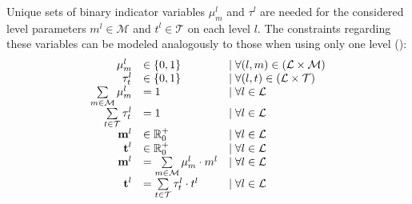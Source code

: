 \documentclass[a4paper,titlepage,onecolumn,oneside,12pt,nenglish,titlepage=firstiscover]{scrbook}
\theoremstyle{plain} %
\theoremstyle{definition} %
\theoremstyle{remark} %
\theoremstyle{plain}
\newcommand{\RR}{\mathbb{R}} %
\newcommand{\minimizerLength}{m}
\newcommand{\threshold}{t}
\newcommand{\level}{l}
\newcommand{\possibleMinimizerLengths}{\mathcal{M}}
\newcommand{\possibleThresholds}{\mathcal{T}}
\newcommand{\indicatorm}{\mu}
\newcommand{\indicatort}{\tau}
\newcommand{\varMinimizerLength}{\textbf{\minimizerLength}}
\newcommand{\varThreshold}{\textbf{\threshold}}
\begin{document}
Unique sets of binary indicator variables $\indicatorm^\level_\minimizerLength$ and $\indicatort^\level$ are needed for the considered level parameters $\minimizerLength^\level \in \possibleMinimizerLengths$ and $\threshold^\level \in \possibleThresholds$ on each level $\level$.
The constraints regarding these variables can be modeled analogously to those when using only one level ():
\[ \begin{array}{rll}
	\indicatorm_\minimizerLength^\level &\in \{0,1\} & \mid \forall (\level,\minimizerLength) \in (\setOfLevels \times \possibleMinimizerLengths) \\
	\indicatort_\threshold^\level &\in \{0,1\} & \mid \forall (\level,\threshold) \in (\setOfLevels \times \possibleThresholds) \\
	\sum\limits_{m \in \possibleMinimizerLengths} \indicatorm_\minimizerLength^\level &= 1 & \mid \forall l \in \setOfLevels\\
	\sum\limits_{t \in \possibleThresholds} \indicatort_\threshold^\level &= 1 & \mid \forall l \in \setOfLevels\\
	\varMinimizerLength^\level &\in \RR^+_0 & \mid \forall l \in \setOfLevels\\
	\varThreshold^\level &\in \RR^+_0 & \mid \forall l \in \setOfLevels\\
	\varMinimizerLength^\level &= \sum\limits_{m \in \possibleMinimizerLengths} \indicatorm_\minimizerLength^\level \cdot \minimizerLength^\level & \mid \forall l \in \setOfLevels \\
	\varThreshold^\level &= \sum\limits_{t \in \possibleThresholds} \indicatort_\threshold^\level \cdot \threshold^\level & \mid \forall l \in \setOfLevels
\end{array} \]
\end{document}

